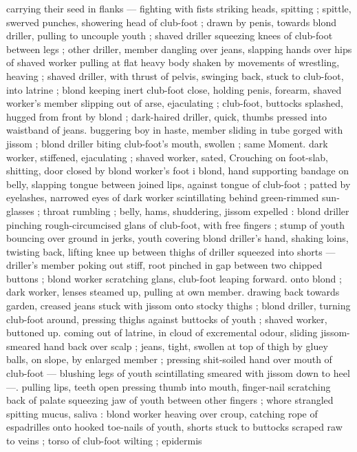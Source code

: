 carrying their seed in flanks --- fighting with fists striking heads, 
spitting ; spittle, swerved punches, showering head of club-foot ; 
drawn by penis, towards blond driller, pulling to uncouple youth ; 
shaved driller squeezing knees of club-foot between legs ; other 
driller, member dangling over jeans, slapping hands over hips of 
shaved worker pulling at flat heavy body shaken by movements of 
wrestling, heaving ; shaved driller, with thrust of pelvis, swinging 
back, stuck to club-foot, into latrine ; blond keeping inert club-foot 
close, holding penis, forearm, shaved worker's member slipping out 
of arse, ejaculating ; club-foot, buttocks splashed, hugged from front 
by blond ; dark-haired driller, quick, thumbs pressed into waistband 
of jeans. buggering boy in haste, member sliding in tube gorged with 
jissom ; blond driller biting club-foot's mouth, swollen ; same 
Moment. dark worker, stiffened, ejaculating ; shaved worker, sated, 
Crouching on foot-slab, shitting, door closed by blond worker's foot 
i blond, hand supporting bandage on belly, slapping tongue between 
joined lips, against tongue of club-foot ; patted by eyelashes, 
narrowed eyes of dark worker scintillating behind green-rimmed sun- 
glasses ; throat rumbling ; belly, hams, shuddering, jissom expelled : 
blond driller pinching rough-circumcised glans of club-foot, with free 
fingers ; stump of youth bouncing over ground in jerks, youth 
covering blond driller's hand, shaking loins, twisting back, lifting 
knee up between thighs of driller squeezed into shorts --- driller's 
member poking out stiff, root pinched in gap between two chipped 
buttons ; blond worker scratching glans, club-foot leaping forward. 
onto blond ; dark worker, lenses steamed up, pulling at own member. 
drawing back towards garden, creased jeans stuck with jissom onto 
stocky thighs ; blond driller, turning club-foot around, pressing 
thighs against buttocks of youth ; shaved worker, buttoned up. 
coming out of latrine, in cloud of excremental odour, sliding jissom- 
smeared hand back over scalp ; jeans, tight, swollen at top of thigh 
by gluey balls, on slope, by enlarged member ; pressing shit-soiled 
hand over mouth of club-foot --- blushing legs of youth scintillating 
smeared with jissom down to heel ---. pulling lips, teeth open 
pressing thumb into mouth, finger-nail scratching back of palate 
squeezing jaw of youth between other fingers ; whore strangled 
spitting mucus, saliva : blond worker heaving over croup, catching 
rope of espadrilles onto hooked toe-nails of youth, shorts stuck to 
buttocks scraped raw to veins ; torso of club-foot wilting ; epidermis 
